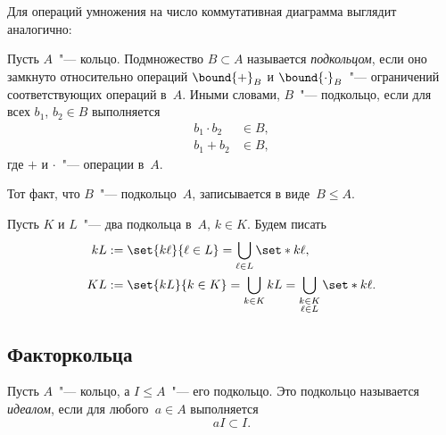 Для операций умножения на число коммутативная диаграмма выглядит аналогично:

\begin{definition}
	Пусть $A$~"--- кольцо. Подмножество $B \subset A$ называется \emph{подкольцом}, если оно замкнуто относительно операций $\bound{+}_B$ и $\bound{\cdot}_B$~"--- ограничений соответствующих операций в~$A$. Иными словами, $B$~"--- подкольцо, если для всех $b_1$, $b_2 \in B$ выполняется
	\begin{align*}
		b_1 \cdot b_2 &\in B,
		\\
		b_1 + b_2 &\in B,
	\end{align*}
	где $+$ и $\cdot$~"--- операции в~$A$.
\end{definition}

Тот факт, что $B$~"--- подкольцо~$A$, записывается в виде~$B \leq A$.

\begin{definition}
	Пусть $K$ и $L$~"--- два подкольца в~$A$, $k \in K$. Будем писать
	\begin{align*}
		kL &:= \set{k\ell}{\ell \in L}
		=
		\bigcup_{\ell \in L} \set*{k\ell}
		,
		\\
		KL &:= \set{kL}{k \in K}
		=
		\bigcup_{k \in K} kL
		=
		\bigcup_{%
			\substack{
				k \in K
				\\
				\ell \in L
			}
		}
		\set*{k\ell}
		.
	\end{align*}
\end{definition}

\subsection{Факторкольца}

\begin{definition}
	Пусть $A$~"--- кольцо, а $I \leq A$~"--- его подкольцо. Это подкольцо называется \emph{идеалом}, если для любого~$a \in A$ выполняется
	\[
		aI \subset I
		.
	\]
\end{definition}

